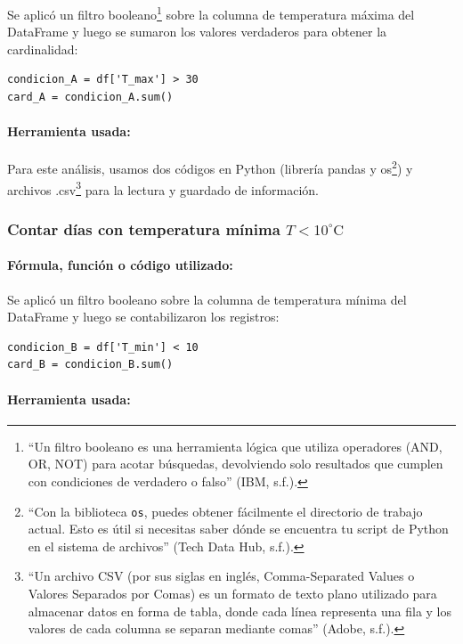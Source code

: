 \documentclass[12pt]{article}
\begin{document}
Se aplicó un filtro booleano\footnote{``Un filtro booleano es una herramienta lógica que utiliza operadores (AND, OR, NOT) para acotar búsquedas, devolviendo solo resultados que cumplen con condiciones de verdadero o falso'' (IBM, s.f.).} sobre la columna de temperatura máxima del DataFrame y luego se sumaron los valores verdaderos para obtener la cardinalidad:
\begin{verbatim}
condicion_A = df['T_max'] > 30
card_A = condicion_A.sum()
\end{verbatim}

\paragraph{Herramienta usada:} %

Para este análisis, usamos dos códigos en Python (librería pandas y os\footnote{``Con la biblioteca \texttt{os}, puedes obtener fácilmente el directorio de trabajo actual. Esto es útil si necesitas saber dónde se encuentra tu script de Python en el sistema de archivos'' (Tech Data Hub, s.f.).}) y archivos .csv\footnote{``Un archivo CSV (por sus siglas en inglés, Comma-Separated Values o Valores Separados por Comas) es un formato de texto plano utilizado para almacenar datos en forma de tabla, donde cada línea representa una fila y los valores de cada columna se separan mediante comas'' (Adobe, s.f.).} para la lectura y guardado de información.

\subsubsection{Contar días con temperatura mínima $T < 10^\circ \text{C}$}

\paragraph{Fórmula, función o código utilizado:} 

Se aplicó un filtro booleano sobre la columna de temperatura mínima del DataFrame y luego se contabilizaron los registros:
\begin{verbatim}
condicion_B = df['T_min'] < 10
card_B = condicion_B.sum()
\end{verbatim}

\paragraph{Herramienta usada:}
\end{document}
